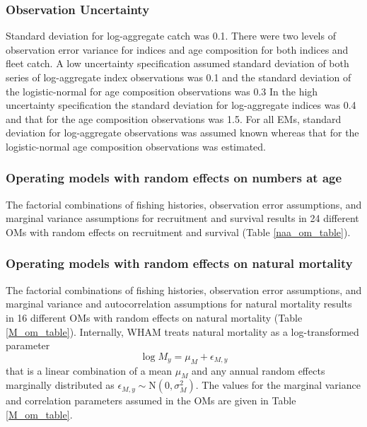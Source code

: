 \documentclass[
  12pt,
]{article}
\begin{document}
\hypertarget{observation-uncertainty}{%
\subsubsection*{Observation Uncertainty}\label{observation-uncertainty}}

Standard deviation for log-aggregate catch was 0.1. There were two
levels of observation error variance for indices and age composition for
both indices and fleet catch. A low uncertainty specification assumed
standard deviation of both series of log-aggregate index observations
was 0.1 and the standard deviation of the logistic-normal for age
composition observations was 0.3 In the high uncertainty specification
the standard deviation for log-aggregate indices was 0.4 and that for
the age composition observations was 1.5. For all EMs, standard
deviation for log-aggregate observations was assumed known whereas that
for the logistic-normal age composition observations was estimated.

\hypertarget{operating-models-with-random-effects-on-numbers-at-age}{%
\subsubsection*{Operating models with random effects on numbers at
age}\label{operating-models-with-random-effects-on-numbers-at-age}}

The factorial combinations of fishing histories, observation error
assumptions, and marginal variance assumptions for recruitment and
survival results in 24 different OMs with random effects on recruitment
and survival (Table \ref{naa_om_table}).

\hypertarget{operating-models-with-random-effects-on-natural-mortality}{%
\subsubsection*{Operating models with random effects on natural
mortality}\label{operating-models-with-random-effects-on-natural-mortality}}

The factorial combinations of fishing histories, observation error
assumptions, and marginal variance and autocorrelation assumptions for
natural mortality results in 16 different OMs with random effects on
natural mortality (Table \ref{M_om_table}). Internally, WHAM treats
natural mortality as a log-transformed parameter \[
\log M_y = \mu_M + \epsilon_{M,y}
\] that is a linear combination of a mean \(\mu_M\) and any annual
random effects marginally distributed as
\(\epsilon_{M,y} \sim \text{N}\left(0,\sigma_M^2\right)\). The values
for the marginal variance and correlation parameters assumed in the OMs
are given in Table \ref{M_om_table}.
\end{document}
